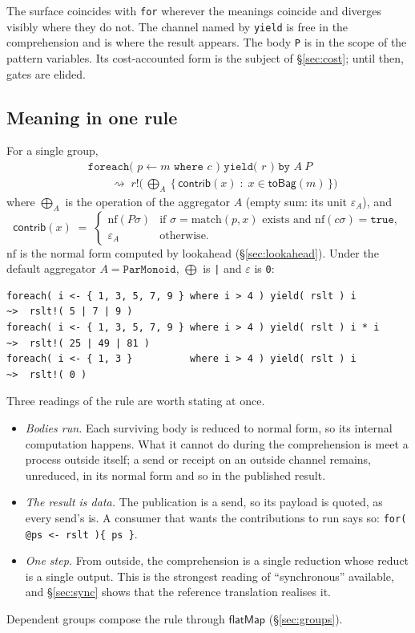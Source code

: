 \documentclass[11pt]{article}
\theoremstyle{definition}
\theoremstyle{plain}
\theoremstyle{remark}
\newcommand{\bind}{\mathsf{flatMap}}
\newcommand{\red}{\rightsquigarrow}
\newcommand{\nf}{\mathrm{nf}}
\newcommand{\match}{\mathrm{match}}
\begin{document}
The surface coincides with \texttt{for} wherever the meanings coincide and
diverges visibly where they do not. The channel named by \texttt{yield} is free
in the comprehension and is where the result appears. The body \texttt{P} is in
the scope of the pattern variables. Its cost-accounted form is the subject of
\S\ref{sec:cost}; until then, gates are elided.

\subsection{Meaning in one rule}
\label{sec:rule}

For a single group,
\begin{align*}
&\texttt{foreach( }p \leftarrow m\texttt{ where }c\texttt{ ) yield( }r\texttt{ ) by }A\ P\\
&\qquad\red\;
r!\Big(\,\textstyle\bigoplus_{A}\ \big\{\, \mathsf{contrib}(x) \;:\; x \in \mathsf{toBag}(m) \,\big\}\Big)
\end{align*}
where \(\bigoplus_A\) is the operation of the aggregator \(A\) (empty sum: its
unit \(\varepsilon_A\)), and
\[
\mathsf{contrib}(x) \;=\;
\begin{cases}
\nf(P\sigma) & \text{if } \sigma = \match(p, x) \text{ exists and } \nf(c\sigma) = \texttt{true},\\
\varepsilon_A & \text{otherwise.}
\end{cases}
\]
\(\nf\) is the normal form computed by lookahead (\S\ref{sec:lookahead}). Under
the default aggregator \(A = \texttt{ParMonoid}\), \(\bigoplus\) is \texttt{|}
and \(\varepsilon\) is \texttt{0}:
\begin{lstlisting}
foreach( i <- { 1, 3, 5, 7, 9 } where i > 4 ) yield( rslt ) i         ~>  rslt!( 5 | 7 | 9 )
foreach( i <- { 1, 3, 5, 7, 9 } where i > 4 ) yield( rslt ) i * i     ~>  rslt!( 25 | 49 | 81 )
foreach( i <- { 1, 3 }          where i > 4 ) yield( rslt ) i         ~>  rslt!( 0 )
\end{lstlisting}
Three readings of the rule are worth stating at once.
\begin{itemize}[nosep]
\item \emph{Bodies run.} Each surviving body is reduced to normal form, so its
internal computation happens. What it cannot do during the comprehension is
meet a process outside itself; a send or receipt on an outside channel remains,
unreduced, in its normal form and so in the published result.
\item \emph{The result is data.} The publication is a send, so its payload is
quoted, as every send's is. A consumer that wants the contributions to run says
so: \verb|for( @ps <- rslt ){ ps }|.
\item \emph{One step.} From outside, the comprehension is a single reduction
whose reduct is a single output. This is the strongest reading of
``synchronous'' available, and \S\ref{sec:sync} shows that the reference
translation realises it.
\end{itemize}
Dependent groups compose the rule through \(\bind\) (\S\ref{sec:groups}).
\end{document}
